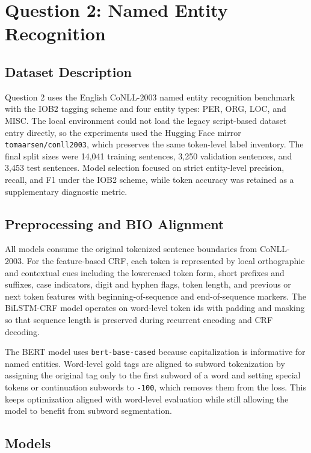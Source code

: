\section{Question 2: Named Entity Recognition}

\subsection{Dataset Description}

Question 2 uses the English CoNLL-2003 named entity recognition benchmark \cite{tjong2003conll} with the IOB2 tagging scheme and four entity types: PER, ORG, LOC, and MISC. The local environment could not load the legacy script-based dataset entry directly, so the experiments used the Hugging Face mirror \texttt{tomaarsen/conll2003}, which preserves the same token-level label inventory. The final split sizes were 14{,}041 training sentences, 3{,}250 validation sentences, and 3{,}453 test sentences. Model selection focused on strict entity-level precision, recall, and F1 under the IOB2 scheme, while token accuracy was retained as a supplementary diagnostic metric.

\subsection{Preprocessing and BIO Alignment}

All models consume the original tokenized sentence boundaries from CoNLL-2003. For the feature-based CRF, each token is represented by local orthographic and contextual cues including the lowercased token form, short prefixes and suffixes, case indicators, digit and hyphen flags, token length, and previous or next token features with beginning-of-sequence and end-of-sequence markers. The BiLSTM-CRF model operates on word-level token ids with padding and masking so that sequence length is preserved during recurrent encoding and CRF decoding.

The BERT model uses \texttt{bert-base-cased} because capitalization is informative for named entities. Word-level gold tags are aligned to subword tokenization by assigning the original tag only to the first subword of a word and setting special tokens or continuation subwords to \texttt{-100}, which removes them from the loss. This keeps optimization aligned with word-level evaluation while still allowing the model to benefit from subword segmentation.

\subsection{Models}

